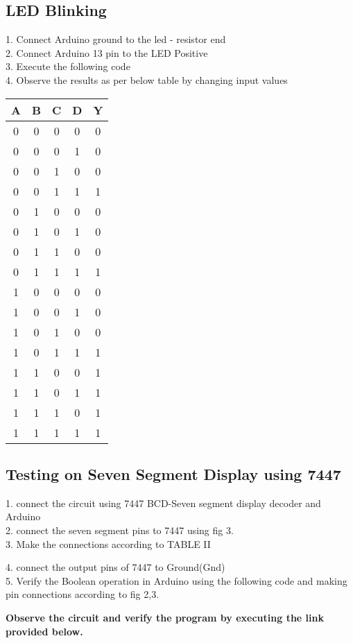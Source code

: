 \documentclass[journal,12pt,twocolumn]{IEEEtran}
\begin{document}
\subsection{LED Blinking}
1. Connect Arduino ground to the led - resistor end\\
2. Connect Arduino 13 pin to the LED Positive\\
3. Execute the following code\\
4. Observe the results as per below table by changing input values\\
\begin{table}[!h]
\begin{tabular}{|c|c|c|c|c|}
\centering
A & B & C & D & Y \\ 
\hline 
0 & 0 & 0 & 0 & 0\\
0 & 0 & 0 & 1 & 0\\
0 & 0 & 1 & 0 & 0\\
0 & 0 & 1 & 1 & 1\\
0 & 1 & 0 & 0 & 0\\
0 & 1 & 0 & 1 & 0\\
0 & 1 & 1 & 0 & 0\\
0 & 1 & 1 & 1 & 1\\
1 & 0 & 0 & 0 & 0\\
1 & 0 & 0 & 1 & 0\\
1 & 0 & 1 & 0 & 0\\
1 & 0 & 1 & 1 & 1\\
1 & 1 & 0 & 0 & 1\\
1 & 1 & 0 & 1 & 1\\
1 & 1 & 1 & 0 & 1\\
1 & 1 & 1 & 1 & 1\\
\end{tabular}
\end{table}
\subsection{Testing on Seven Segment Display using 7447}
1. connect the circuit using 7447 BCD-Seven segment display decoder and Arduino\\
2.  connect the seven segment pins to 7447 using fig 3.\\
3.  Make the connections according to TABLE II \\

\begin{table}[!h]
\centering
\caption{}
\label{table:7447_disp}
\end{table}
4. connect the output pins of 7447 to Ground(Gnd)\\
5. Verify the Boolean operation in Arduino using the following code and making
pin connections according to fig 2,3.

\textbf{Observe the circuit and verify the program by executing the link provided below.}\\
\begin{center}
\end{center}
\end{document}
